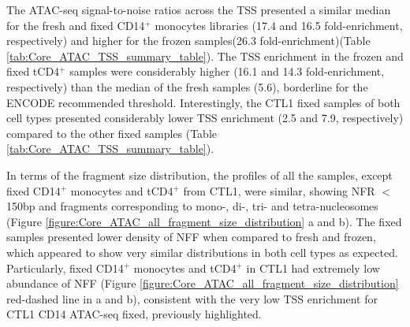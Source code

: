 The ATAC-seq signal-to-noise ratios across the TSS presented a similar median for the fresh and fixed CD14$^+$ monocytes libraries (17.4 and 16.5 fold-enrichment, respectively) and higher for the frozen samples(26.3 fold-enrichment)(Table \ref{tab:Core_ATAC_TSS_summary_table}). The TSS enrichment in the frozen and fixed tCD4$^+$ samples were considerably higher (16.1 and 14.3 fold-enrichment, respectively) than the median of the fresh samples (5.6), borderline for the ENCODE recommended threshold. Interestingly, the CTL1 fixed samples of both cell types presented considerably lower TSS enrichment (2.5 and 7.9, respectively) compared to the other fixed samples (Table \ref{tab:Core_ATAC_TSS_summary_table}). 


In terms of the fragment size distribution, the profiles of all the samples, except fixed CD14$^+$ monocytes and tCD4$^+$ from CTL1, were similar, showing NFR $<$150bp and fragments corresponding to mono-, di-, tri- and tetra-nucleosomes (Figure \ref{figure:Core_ATAC_all_fragment_size_distribution} a and b). The fixed samples presented lower density of NFF when compared to fresh and frozen, which appeared to show very similar distributions in both cell types as expected. Particularly, fixed CD14$^+$ monocytes and tCD4$^+$ in CTL1 had extremely low abundance of NFF (Figure \ref{figure:Core_ATAC_all_fragment_size_distribution} red-dashed line in a and b), consistent with the very low TSS enrichment for CTL1 CD14 ATAC-seq fixed, previously highlighted. 

